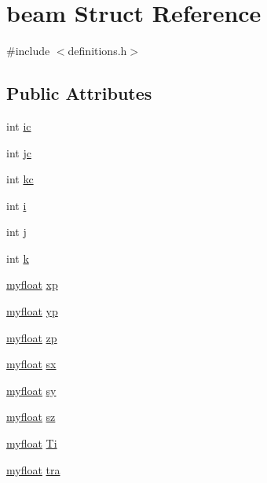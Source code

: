 \hypertarget{structbeam}{}\section{beam Struct Reference}
\label{structbeam}


{\ttfamily \#include $<$definitions.\+h$>$}

\subsection*{Public Attributes}
\begin{DoxyCompactItemize}
\item 
int \hyperlink{structbeam_ae95496e8b11d00bbfa6c4c8211332c0f}{ic}
\item 
int \hyperlink{structbeam_acc755aebd1826c0a5a9bb3d3932862fd}{jc}
\item 
int \hyperlink{structbeam_aeab7cdbcba10ab80c877632fbfcb1baf}{kc}
\item 
int \hyperlink{structbeam_af71c6a7b13bc0e802d4509bd6c897d61}{i}
\item 
int \hyperlink{structbeam_afe081bb416b5ca8873cd8e6d0c9cf200}{j}
\item 
int \hyperlink{structbeam_a7a5235e4c3c368d22aa75bbb14ad7a9f}{k}
\item 
\hyperlink{param_8h_a5f097c9f3873af7be7fc156e6a06ca5e}{myfloat} \hyperlink{structbeam_a088f04026b8f2bfad73bf6b4c92d03fc}{xp}
\item 
\hyperlink{param_8h_a5f097c9f3873af7be7fc156e6a06ca5e}{myfloat} \hyperlink{structbeam_af79221b5ea06c3a5d9e34613f6d69017}{yp}
\item 
\hyperlink{param_8h_a5f097c9f3873af7be7fc156e6a06ca5e}{myfloat} \hyperlink{structbeam_a13f7bcacf93798f00d936a3bd54c58da}{zp}
\item 
\hyperlink{param_8h_a5f097c9f3873af7be7fc156e6a06ca5e}{myfloat} \hyperlink{structbeam_a6248f4a027e8e97a532ccde144413117}{sx}
\item 
\hyperlink{param_8h_a5f097c9f3873af7be7fc156e6a06ca5e}{myfloat} \hyperlink{structbeam_ab80ebd91cc9c6bd8cb6fa77918b525ff}{sy}
\item 
\hyperlink{param_8h_a5f097c9f3873af7be7fc156e6a06ca5e}{myfloat} \hyperlink{structbeam_a40163a5550c2b6a1807db5e2d6b0321b}{sz}
\item 
\hyperlink{param_8h_a5f097c9f3873af7be7fc156e6a06ca5e}{myfloat} \hyperlink{structbeam_a83c71ff3d5c8642ef7ea74496ab19dc8}{Ti}
\item 
\hyperlink{param_8h_a5f097c9f3873af7be7fc156e6a06ca5e}{myfloat} \hyperlink{structbeam_a065003551b2a2cddca223bdeb2a7ade0}{tra}
\end{DoxyCompactItemize}


